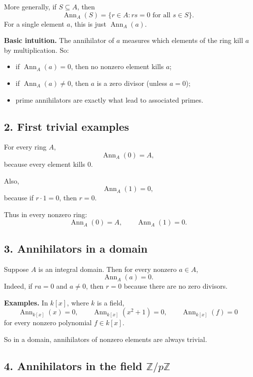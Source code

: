 \documentclass[12pt,a4paper,oneside]{report}
\DeclareMathOperator{\Ann}{Ann}
\theoremstyle{notespace}
\begin{document}
	More generally, if \(S\subseteq A\), then
	\[
	\Ann_A(S)=\{r\in A:rs=0\text{ for all }s\in S\}.
	\]
	For a single element \(a\), this is just \(\Ann_A(a)\).
	
	\medskip
	
	\noindent
	\textbf{Basic intuition.}
	The annihilator of \(a\) measures which elements of the ring kill \(a\) by multiplication.
	So:
	\begin{itemize}
		\item if \(\Ann_A(a)=0\), then no nonzero element kills \(a\);
		\item if \(\Ann_A(a)\neq 0\), then \(a\) is a zero divisor (unless \(a=0\));
		\item prime annihilators are exactly what lead to associated primes.
	\end{itemize}
	
	\subsection{2. First trivial examples}
	
	For every ring \(A\),
	\[
	\Ann_A(0)=A,
	\]
	because every element kills \(0\).
	
	Also,
	\[
	\Ann_A(1)=0,
	\]
	because if \(r\cdot 1=0\), then \(r=0\).
	
	Thus in every nonzero ring:
	\[
	\Ann_A(0)=A,\qquad \Ann_A(1)=0.
	\]
	
	\subsection{3. Annihilators in a domain}
	
	Suppose \(A\) is an integral domain. Then for every nonzero \(a\in A\),
	\[
	\Ann_A(a)=0.
	\]
	Indeed, if \(ra=0\) and \(a\neq 0\), then \(r=0\) because there are no zero divisors.
	
	\medskip
	
	\noindent
	\textbf{Examples.}
	In \(k[x]\), where \(k\) is a field,
	\[
	\Ann_{k[x]}(x)=0,\qquad \Ann_{k[x]}(x^2+1)=0,\qquad \Ann_{k[x]}(f)=0
	\]
	for every nonzero polynomial \(f\in k[x]\).
	
	So in a domain, annihilators of nonzero elements are always trivial.
	
	\subsection{4. Annihilators in the field \(\mathbb Z/p\mathbb Z\)}
	
\end{document}
